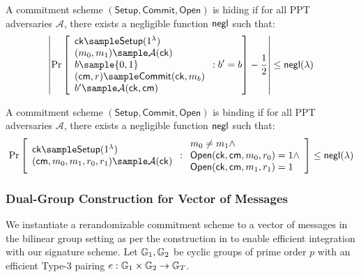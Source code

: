 \begin{definition}[Hiding]
A commitment scheme $(\mathsf{Setup}, \mathsf{Commit}, \mathsf{Open})$ is hiding if for all PPT adversaries $\mathcal{A}$, there exists a negligible function $\mathsf{negl}$ such that:
$$\left|\Pr\left[\begin{array}{l}
    \mathsf{ck} \sample \mathsf{Setup}(1^\lambda) \\
    (m_0, m_1) \sample \mathcal{A}(\mathsf{ck}) \\
    b \sample \{0,1\} \\
    (\mathsf{cm}, r) \sample \mathsf{Commit}(\mathsf{ck}, m_b) \\
    b' \sample \mathcal{A}(\mathsf{ck}, \mathsf{cm})
\end{array} : b' = b\right] - \frac{1}{2}\right| \leq \negl(\lambda)$$
\end{definition}

\begin{definition}[Binding]
A commitment scheme $(\mathsf{Setup}, \mathsf{Commit}, \mathsf{Open})$ is binding if for all PPT adversaries $\mathcal{A}$, there exists a negligible function $\mathsf{negl}$ such that:
$$\Pr\left[\begin{array}{l}
    \mathsf{ck} \sample \mathsf{Setup}(1^\lambda) \\
    (\mathsf{cm}, m_0, m_1, r_0, r_1) \sample \mathcal{A}(\mathsf{ck})
\end{array} : \begin{array}{l}
    m_0 \neq m_1 \land \\
    \mathsf{Open}(\mathsf{ck}, \mathsf{cm}, m_0, r_0) = 1 \land \\
    \mathsf{Open}(\mathsf{ck}, \mathsf{cm}, m_1, r_1) = 1
\end{array}\right] \leq \negl(\lambda)$$
\end{definition}



\subsubsection{Dual-Group Construction for Vector of Messages}

We instantiate a rerandomizable commitment scheme to a vector of messages in the bilinear group setting as per the construction in \cite{tomescu_utt_2022} to enable efficient integration with our signature scheme. Let $\mathbb{G}_1, \mathbb{G}_2$ be cyclic groups of prime order $p$ with an efficient Type-3 pairing $e: \mathbb{G}_1 \times \mathbb{G}_2 \to \mathbb{G}_T$.


